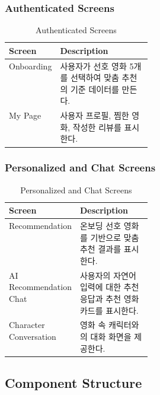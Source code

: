 \documentclass[11pt,a4paper]{article}
\renewcommand{\arraystretch}{1.18}
\begin{document}
\hypertarget{authenticated-screens}{%
\subsubsection{Authenticated Screens}\label{authenticated-screens}}

\begin{table}[H]
\centering
\small
\setlength{\tabcolsep}{5pt}
\renewcommand{\arraystretch}{1.28}
\begin{tabularx}{\linewidth}{@{}>{\RaggedRight\arraybackslash}p{0.28\linewidth}>{\RaggedRight\arraybackslash}X@{}}
\toprule
\textbf{Screen} & \textbf{Description} \\
\midrule
Onboarding & 사용자가 선호 영화 5개를 선택하여 맞춤 추천의 기준 데이터를 만든다. \\
My Page & 사용자 프로필, 찜한 영화, 작성한 리뷰를 표시한다. \\
\bottomrule
\end{tabularx}
\caption{Authenticated Screens}
\end{table}

\hypertarget{personalized-and-chat-screens}{%
\subsubsection{Personalized and Chat Screens}\label{personalized-and-chat-screens}}

\begin{table}[H]
\centering
\small
\setlength{\tabcolsep}{5pt}
\renewcommand{\arraystretch}{1.28}
\begin{tabularx}{\linewidth}{@{}>{\RaggedRight\arraybackslash}p{0.28\linewidth}>{\RaggedRight\arraybackslash}X@{}}
\toprule
\textbf{Screen} & \textbf{Description} \\
\midrule
Recommendation & 온보딩 선호 영화를 기반으로 맞춤 추천 결과를 표시한다. \\
AI Recommendation Chat & 사용자의 자연어 입력에 대한 추천 응답과 추천 영화 카드를 표시한다. \\
Character Conversation & 영화 속 캐릭터와의 대화 화면을 제공한다. \\
\bottomrule
\end{tabularx}
\caption{Personalized and Chat Screens}
\end{table}

\hypertarget{component-structure}{%
\subsection{Component Structure}\label{component-structure}}
\end{document}
